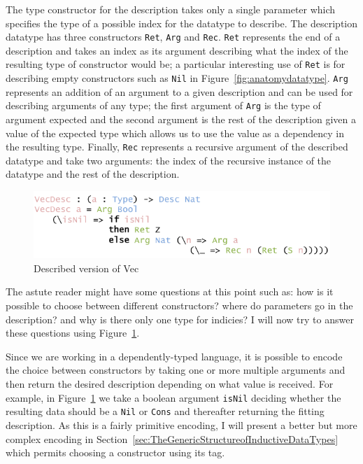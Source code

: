 \documentclass{ituthesis}
\begin{document}
The type constructor for the description takes only a single parameter which specifies the type of a possible index for the datatype to describe.
The description datatype has three constructors \texttt{Ret}, \texttt{Arg} and \texttt{Rec}.
\texttt{Ret} represents the end of a description and takes an index as its argument describing what the index of the resulting type of constructor would be; a particular interesting use of \texttt{Ret} is for describing empty constructors such as \texttt{Nil} in Figure~\ref{fig:anatomydatatype}.
\texttt{Arg} represents an addition of an argument to a given description and can be used for describing arguments of any type; the first argument of \texttt{Arg} is the type of argument expected and the second argument is the rest of the description given a value of the expected type which allows us to use the value as a dependency in the resulting type. Finally, \texttt{Rec} represents a recursive argument of the described datatype and take two arguments: the index of the recursive instance of the datatype and the rest of the description.

\begin{figure}[ht]
\begin{center}
    \includegraphics[scale=0.5]{Figures/VectorDescription.png}
\end{center}
\caption{Described version of Vec}
\label{fig:descvec}
\end{figure}

The astute reader might have some questions at this point such as: how is it possible to choose between different constructors? where do parameters go in the description? and why is there only one type for indicies?
I will now try to answer these questions using Figure~\ref{fig:descvec}.

Since we are working in a dependently-typed language, it is possible to encode the choice between constructors by taking one or more multiple arguments and then return the desired description depending on what value is received.
For example, in Figure~\ref{fig:descvec} we take a boolean argument \texttt{isNil} deciding whether the resulting data should be a \texttt{Nil} or \texttt{Cons} and thereafter returning the fitting description.
As this is a fairly primitive encoding, I will present a better but more complex encoding in Section~\ref{sec:TheGenericStructureofInductiveDataTypes} which permits choosing a constructor using its tag.
\end{document}
